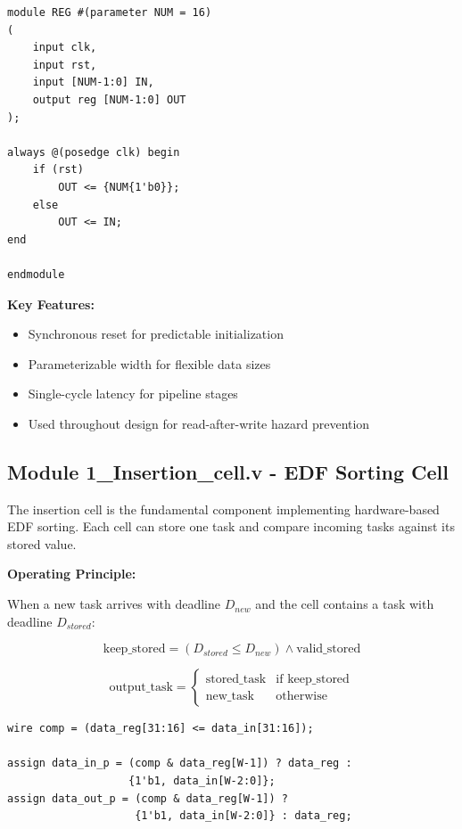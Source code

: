 \documentclass[12pt,a4paper]{article}
\begin{document}
\begin{lstlisting}[style=verilog, caption={Register Module Interface}]
module REG #(parameter NUM = 16)
(
    input clk,
    input rst,
    input [NUM-1:0] IN,
    output reg [NUM-1:0] OUT
);

always @(posedge clk) begin
    if (rst)
        OUT <= {NUM{1'b0}};
    else
        OUT <= IN;
end

endmodule
\end{lstlisting}

\textbf{Key Features:}
\begin{itemize}
    \item Synchronous reset for predictable initialization
    \item Parameterizable width for flexible data sizes
    \item Single-cycle latency for pipeline stages
    \item Used throughout design for read-after-write hazard prevention
\end{itemize}

\subsection{Module 1\_Insertion\_cell.v - EDF Sorting Cell}

The insertion cell is the fundamental component implementing hardware-based EDF sorting. Each cell can store one task and compare incoming tasks against its stored value.

\textbf{Operating Principle:}

When a new task arrives with deadline $D_{new}$ and the cell contains a task with deadline $D_{stored}$:

\begin{equation}
    \text{keep\_stored} = (D_{stored} \leq D_{new}) \land \text{valid\_stored}
\end{equation}

\begin{equation}
    \text{output\_task} =
    \begin{cases}
        \text{stored\_task} & \text{if keep\_stored} \\
        \text{new\_task} & \text{otherwise}
    \end{cases}
\end{equation}

\begin{lstlisting}[style=verilog, caption={Insertion Cell Core Comparison Logic}]
wire comp = (data_reg[31:16] <= data_in[31:16]);

assign data_in_p = (comp & data_reg[W-1]) ? data_reg :
                   {1'b1, data_in[W-2:0]};
assign data_out_p = (comp & data_reg[W-1]) ?
                    {1'b1, data_in[W-2:0]} : data_reg;
\end{lstlisting}
\end{document}
